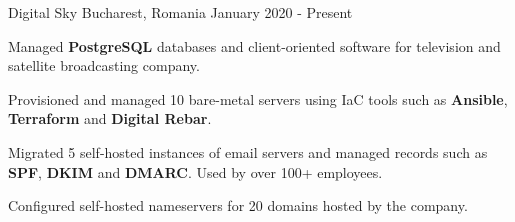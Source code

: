 \begin{cventries}
    {Digital Sky}
    {Bucharest, Romania}
    {January 2020 - Present}
    {
      \begin{cvitems}
        \item {Managed \textbf{PostgreSQL} databases and client-oriented software for television and satellite broadcasting company.}
        \item {Provisioned and managed 10 bare-metal servers using IaC tools such as \textbf{Ansible}, \textbf{Terraform} and \textbf{Digital Rebar}.}
        \item {Migrated 5 self-hosted instances of email servers and managed records such as \textbf{SPF}, \textbf{DKIM} and \textbf{DMARC}. Used by over 100+ employees.}
        \item {Configured self-hosted nameservers for 20 domains hosted by the company.}
      \end{cvitems}
    }
\end{cventries}

